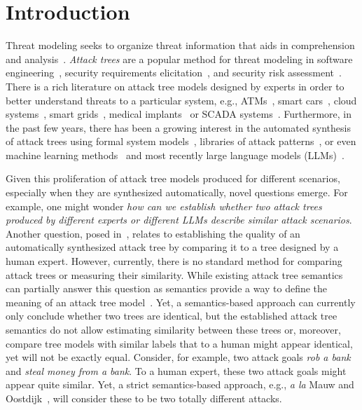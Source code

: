 

\section{Introduction}
\label{sec:introduction}

Threat modeling seeks to organize threat information that aids in comprehension and analysis~\cite{andersonSecurityEngineeringGuide2020,schneierSecretsLiesDigital2000}. \emph{Attack trees} are a popular method for threat modeling in software engineering~\cite{shostack2014threat,tarandach2020threat}, security requirements elicitation~\cite{rashid2016discovering,mai2018modeling}, and security risk assessment~\cite{ingoldsby2010attack,paul2014unifying}. There is a rich literature on attack tree models designed by experts in order to better understand threats to a particular system, e.g., ATMs~\cite{fraile2016using}, smart cars~\cite{kong2018security,ren2011novel}, cloud systems~\cite{wang2012threat,duncan2019combined}, smart grids~\cite{beckers2014determining,mclaughlin2010energy}, medical implants~\cite{siddiqi2018attack} or SCADA systems~\cite{ten2007vulnerability}. Furthermore, in the past few years, there has been a growing interest in the automated synthesis of attack trees using formal system models~\cite{widel2019beyond,ivanova2015attack,vigo2014automated,pinchinat2015atsyra,gadyatskayaRefinementAwareGenerationAttack2017}, libraries of attack patterns~\cite{jhawar2018semi,bryans2020template}, or even machine learning methods~\cite{sowka2021towards} and most recently large language models (LLMs)~\cite{gadyatskaya2023chatgpt}.

Given this proliferation of attack tree models produced for different scenarios, especially when they are synthesized automatically, novel questions emerge. For example, one might wonder \emph{how can we establish whether two attack trees produced by different experts or different LLMs describe similar attack scenarios}. 
Another question, posed in~\cite{gadyatskaya2023chatgpt}, relates to establishing the quality of an automatically synthesized attack tree by comparing it to a tree designed by a human expert. However, currently, there is no standard method for comparing attack trees or measuring their similarity. While existing attack tree semantics can partially answer this question as semantics provide a way to define the meaning of an attack tree model~\cite{mauwFoundationsAttackTrees2006}. Yet, a semantics-based approach can currently only conclude whether two trees are identical, but the established attack tree semantics do not allow estimating similarity between these trees or, moreover, compare tree models with similar labels that to a human might appear identical, yet will not be exactly equal. Consider, for example, two attack goals \emph{rob a bank} and \emph{steal money from a bank}. To a human expert, these two attack goals might appear quite similar. Yet, a strict semantics-based approach, e.g., \emph{a la} Mauw and Oostdijk~\cite{mauwFoundationsAttackTrees2006}, will consider these to be two totally different attacks.  %

